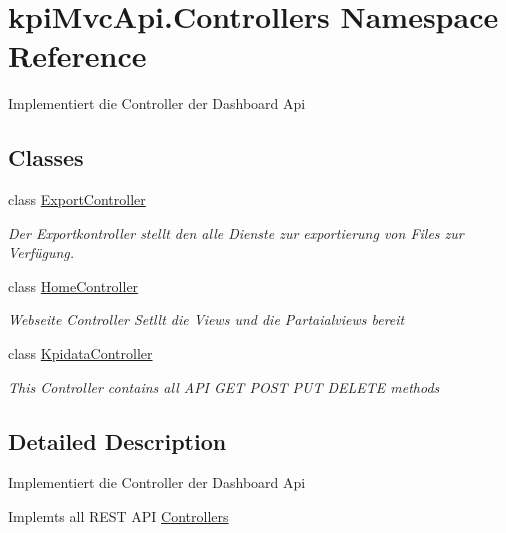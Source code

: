 \hypertarget{namespacekpi_mvc_api_1_1_controllers}{}\section{kpi\+Mvc\+Api.\+Controllers Namespace Reference}
\label{namespacekpi_mvc_api_1_1_controllers}


Implementiert die Controller der Dashboard Api  


\subsection*{Classes}
\begin{DoxyCompactItemize}
\item 
class \hyperlink{classkpi_mvc_api_1_1_controllers_1_1_export_controller}{Export\+Controller}
\begin{DoxyCompactList}\small\item\em Der Exportkontroller stellt den alle Dienste zur exportierung von Files zur Verfügung. \end{DoxyCompactList}\item 
class \hyperlink{classkpi_mvc_api_1_1_controllers_1_1_home_controller}{Home\+Controller}
\begin{DoxyCompactList}\small\item\em Webseite Controller Setllt die Views und die Partaialviews bereit \end{DoxyCompactList}\item 
class \hyperlink{classkpi_mvc_api_1_1_controllers_1_1_kpidata_controller}{Kpidata\+Controller}
\begin{DoxyCompactList}\small\item\em This Controller contains all A\+PI G\+ET P\+O\+ST P\+UT D\+E\+L\+E\+TE methods \end{DoxyCompactList}\end{DoxyCompactItemize}


\subsection{Detailed Description}
Implementiert die Controller der Dashboard Api 

Implemts all R\+E\+ST A\+PI \hyperlink{namespacekpi_mvc_api_1_1_controllers}{Controllers} 